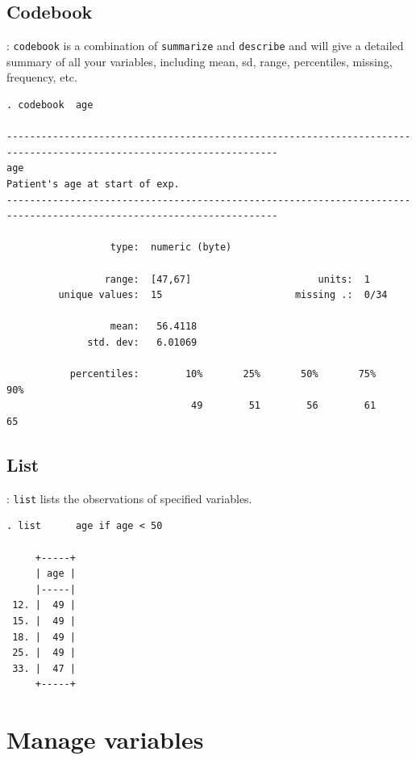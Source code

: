 \subsection{Codebook}
\begin{frame}[fragile]{\secname : \subsecname}
\verb|codebook| is a combination of \verb|summarize| and \verb|describe| and will give a detailed summary of all your variables, including mean, sd, range, percentiles, missing, frequency, etc. \\[4mm]
\tiny
\begin{verbatim}
. codebook  age

---------------------------------------------------------------------------------------------------------------------
age                                                                      Patient's age at start of exp.
---------------------------------------------------------------------------------------------------------------------

                  type:  numeric (byte)

                 range:  [47,67]                      units:  1
         unique values:  15                       missing .:  0/34

                  mean:   56.4118
              std. dev:   6.01069

           percentiles:        10%       25%       50%       75%       90%
                                49        51        56        61        65

\end{verbatim}
\end{frame}

\subsection{List}
\begin{frame}[fragile]{\secname : \subsecname}
\verb|list| lists the observations of specified variables. \\[4mm]
\small
\begin{verbatim}
. list      age if age < 50

     +-----+
     | age |
     |-----|
 12. |  49 |
 15. |  49 |
 18. |  49 |
 25. |  49 |
 33. |  47 |
     +-----+

\end{verbatim}
\end{frame}


\section{Manage variables}
